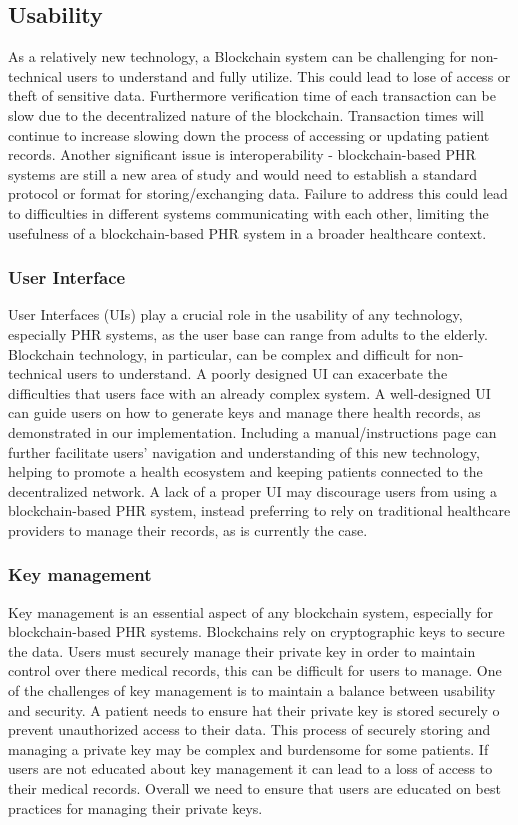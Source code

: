 \documentclass{article}
\begin{document}
\subsection{Usability}
As a relatively new technology, a Blockchain system can be challenging for non-technical users to understand and fully utilize. This could lead to lose of access or theft of sensitive data. Furthermore verification time of each transaction can be slow due to the decentralized nature of the blockchain. Transaction times will continue to increase slowing down the process of accessing or updating patient records. Another significant issue is interoperability - blockchain-based PHR systems are still a new area of study and would need to establish a standard protocol or format for storing/exchanging data. Failure to address this could lead to difficulties in different systems  communicating with each other, limiting the usefulness of a blockchain-based PHR system in a broader healthcare context.

\subsubsection{User Interface}
User Interfaces (UIs) play a crucial role in the usability of any technology, especially PHR systems, as the user base can range from adults to the elderly. Blockchain technology, in particular, can be complex and difficult for non-technical users to understand. A poorly designed UI can exacerbate the difficulties that users face with an already complex system. A well-designed UI can guide users on how to generate keys and manage there health records, as demonstrated in our implementation. Including a manual/instructions page can further facilitate users' navigation and understanding of this new technology, helping to promote a health ecosystem and keeping patients connected to the decentralized network. A lack of a proper UI may discourage users from using a blockchain-based PHR system, instead preferring to rely on traditional healthcare providers to manage their records, as is currently the case.

\subsubsection{Key management}
Key management is an essential aspect of any blockchain system, especially for blockchain-based PHR systems. Blockchains rely on cryptographic keys to secure the data. Users must securely manage their private key in order to maintain control over there medical records, this can be difficult for users to manage. One of the challenges of key management is to maintain a balance between usability and security. A patient needs to ensure hat their private key is stored securely o prevent unauthorized access to their data. This process of securely storing and managing a private key may be complex and burdensome for some patients. If users are not educated about key management it can lead to a loss of access to their medical records. Overall we need to ensure that users are educated on best practices for managing their private keys.
\end{document}
